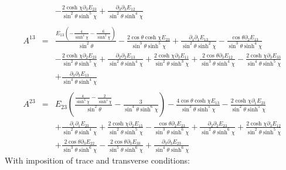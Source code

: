 \documentclass[10pt,letterpaper]{article}
\numberwithin{equation}{section}
\begin{document}
\begin{eqnarray}
&& -  \frac{2 \cosh\chi \partial_{3}E_{23}}{\sin^2\theta \sinh^5\chi} + \frac{\partial_{3}\partial_{3}E_{12}}{\sin^2\theta \sinh^4\chi}
\\  \nonumber\\ 
A^{13}&=& \frac{E_{13} \left(- \frac{4}{\sinh^4\chi} -  \frac{6}{\sinh^2\chi}\right)}{\sin^2\theta} -  \frac{2 \cos\theta \cosh\chi E_{23}}{\sin^3\theta \sinh^5\chi} + \frac{\partial_{1}\partial_{1}E_{13}}{\sin^2\theta \sinh^2\chi} -  \frac{\cos\theta \partial_{2}E_{13}}{\sin^3\theta \sinh^4\chi} \nonumber \\ 
&& -  \frac{2 \cosh\chi \partial_{2}E_{23}}{\sin^2\theta \sinh^5\chi} + \frac{\partial_{2}\partial_{2}E_{13}}{\sin^2\theta \sinh^4\chi} + \frac{2 \cosh\chi \partial_{3}E_{11}}{\sin^2\theta \sinh^3\chi} + \frac{2 \cos\theta \partial_{3}E_{12}}{\sin^3\theta \sinh^4\chi} -  \frac{2 \cosh\chi \partial_{3}E_{33}}{\sin^4\theta \sinh^5\chi} \nonumber \\ 
&& + \frac{\partial_{3}\partial_{3}E_{13}}{\sin^4\theta \sinh^4\chi}
\\  \nonumber\\ 
A^{23}&=& E_{23} \left(\frac{\frac{4}{\sinh^6\chi} -  \frac{2}{\sinh^4\chi}}{\sin^2\theta} -  \frac{3}{\sin^4\theta \sinh^6\chi}\right) -  \frac{4 \cos\theta \cosh\chi E_{13}}{\sin^3\theta \sinh^5\chi} -  \frac{2 \cosh\chi \partial_{1}E_{23}}{\sin^2\theta \sinh^5\chi} \nonumber \\ 
&& + \frac{\partial_{1}\partial_{1}E_{23}}{\sin^2\theta \sinh^4\chi} + \frac{2 \cosh\chi \partial_{2}E_{13}}{\sin^2\theta \sinh^5\chi} -  \frac{\cos\theta \partial_{2}E_{23}}{\sin^3\theta \sinh^6\chi} + \frac{\partial_{2}\partial_{2}E_{23}}{\sin^2\theta \sinh^6\chi} + \frac{2 \cosh\chi \partial_{3}E_{12}}{\sin^2\theta \sinh^5\chi} \nonumber \\ 
&& + \frac{2 \cos\theta \partial_{3}E_{22}}{\sin^3\theta \sinh^6\chi} -  \frac{2 \cos\theta \partial_{3}E_{33}}{\sin^5\theta \sinh^6\chi} + \frac{\partial_{3}\partial_{3}E_{23}}{\sin^4\theta \sinh^6\chi}
\end{eqnarray}
With imposition of trace and transverse conditions:
\end{document}
